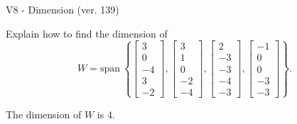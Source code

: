 \begin{exercise}
  \begin{exerciseTitle}V8 - Dimension (ver. 139)\end{exerciseTitle}
  \begin{exerciseStatement}
    Explain how to find the dimension of 
\[W=\mathrm{span}\ \left\{\left[\begin{array}{r}
3 \\
0 \\
-4 \\
3 \\
-2
\end{array}\right] , \left[\begin{array}{r}
3 \\
1 \\
0 \\
-2 \\
-4
\end{array}\right] , \left[\begin{array}{r}
2 \\
-3 \\
-3 \\
-4 \\
-3
\end{array}\right] , \left[\begin{array}{r}
-1 \\
0 \\
0 \\
-3 \\
-3
\end{array}\right]\right\}.\]



  \end{exerciseStatement}
  \begin{exerciseAnswer}
   The dimension of \(W\) is  \(4\).
  


  \end{exerciseAnswer}
\end{exercise}